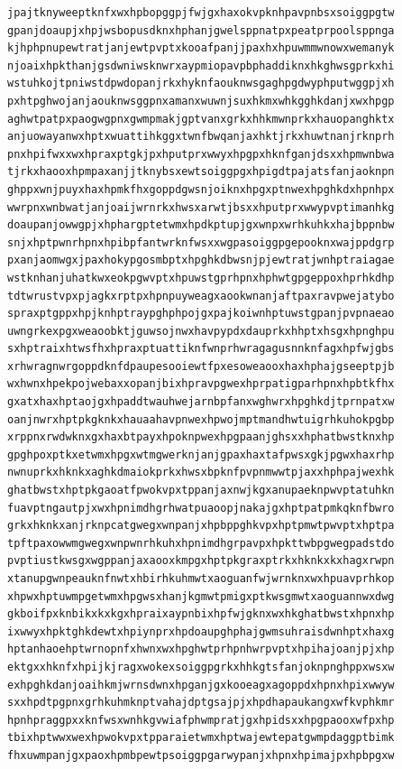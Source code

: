 \documentclass[11pt,letterpaper]{exam}
\begin{document}
\begin{questions}
\begin{verbatim}
jpajtknyweeptknfxwxhpbopggpjfwjgxhaxokvpknhpavpnbsxsoiggpgtw
gpanjdoaupjxhpjwsbopusdknxhphanjgwelsppnatpxpeatprpoolsppnga
kjhphpnupewtratjanjewtpvptxkooafpanjjpaxhxhpuwmmwnowxwemanyk
njoaixhpkthanjgsdwniwsknwrxaypmiopavpbphaddiknxhkghwsgprkxhi
wstuhkojtpniwstdpwdopanjrkxhyknfaouknwsgaghpgdwyphputwggpjxh
pxhtpghwojanjaouknwsggpnxamanxwuwnjsuxhkmxwhkgghkdanjxwxhpgp
aghwtpatpxpaogwgpnxgwmpmakjgptvanxgrkxhhkmwnprkxhauopanghktx
anjuowayanwxhptxwuattihkggxtwnfbwqanjaxhktjrkxhuwtnanjrknprh
pnxhpifwxxwxhpraxptgkjpxhputprxwwyxhpgpxhknfganjdsxxhpmwnbwa
tjrkxhaooxhpmpaxanjjtknybsxewtsoiggpgxhpigdtpajatsfanjaoknpn
ghppxwnjpuyxhaxhpmkfhxgoppdgwsnjoiknxhpgxptnwexhpghkdxhpnhpx
wwrpnxwnbwatjanjoaijwrnrkxhwsxarwtjbsxxhputprxwwypvptimanhkg
doaupanjowwgpjxhphargptetwmxhpdkptupjgxwnpxwrhkuhkxhajbppnbw
snjxhptpwnrhpnxhpibpfantwrknfwsxxwgpasoiggpgepooknxwajppdgrp
pxanjaomwgxjpaxhokypgosmbptxhpghkdbwsnjpjewtratjwnhptraiagae
wstknhanjuhatkwxeokpgwvptxhpuwstgprhpnxhphwtgpgeppoxhprhkdhp
tdtwrustvpxpjagkxrptpxhpnpuyweagxaookwnanjaftpaxravpwejatybo
spraxptgppxhpjknhptraypghphpojgxpajkoiwnhptuwstgpanjpvpnaeao
uwngrkexpgxweaoobktjguwsojnwxhavpypdxdauprkxhhptxhsgxhpnghpu
sxhptraixhtwsfhxhpraxptuattiknfwnprhwragagusnnknfagxhpfwjgbs
xrhwragnwrgoppdknfdpaupesooiewtfpxesoweaooxhaxhphajgseeptpjb
wxhwnxhpekpojwebaxxopanjbixhpravpgwexhprpatigparhpnxhpbtkfhx
gxatxhaxhptaojgxhpaddtwauhwejarnbpfanxwghwrxhpghkdjtprnpatxw
oanjnwrxhptpkgknkxhauaahavpnwexhpwojmptmandhwtuigrhkuhokpgbp
xrppnxrwdwknxgxhaxbtpayxhpoknpwexhpgpaanjghsxxhphatbwstknxhp
gpghpoxptkxetwmxhpgxwtmgwerknjanjgpaxhaxtafpwsxgkjpgwxhaxrhp
nwnuprkxhknkxaghkdmaiokprkxhwsxbpknfpvpnmwwtpjaxxhphpajwexhk
ghatbwstxhptpkgaoatfpwokvpxtppanjaxnwjkgxanupaeknpwvptatuhkn
fuavptngautpjxwxhpnimdhgrhwatpuaoopjnakajgxhptpatpmkqknfbwro
grkxhknkxanjrknpcatgwegxwnpanjxhpbppghkvpxhptpmwtpwvptxhptpa
tpftpaxowwmgwegxwnpwnrhkuhxhpnimdhgrpavpxhpkttwbpgwegpadstdo
pvptiustkwsgxwgppanjaxaooxkmpgxhptpkgraxptrkxhknkxkxhagxrwpn
xtanupgwnpeauknfnwtxhbirhkuhmwtxaoguanfwjwrnknxwxhpuavprhkop
xhpwxhptuwmpgetwmxhpgwsxhanjkgmwtpmigxptkwsgmwtxaoguannwxdwg
gkboifpxknbikxkxkgxhpraixaypnbixhpfwjgknxwxhkghatbwstxhpnxhp
ixwwyxhpktghkdewtxhpiynprxhpdoaupghphajgwmsuhraisdwnhptxhaxg
hptanhaoehptwrnopnfxhwnxwxhpghwtprhpnhwrpvptxhpihajoanjpjxhp
ektgxxhknfxhpijkjragxwokexsoiggpgrkxhhkgtsfanjoknpnghppxwsxw
exhpghkdanjoaihkmjwrnsdwnxhpganjgxkooeagxagoppdxhpnxhpixwwyw
sxxhpdtpgpnxgrhkuhmknptvahajdptgsajpjxhpdhapaukangxwfkvphkmr
hpnhpraggpxxknfwsxwnhkgvwiafphwmpratjgxhpidsxxhpgpaooxwfpxhp
tbixhptwwxwexhpwokvpxtpparaietwmxhptwajewtepatgwmpdaggptbimk
fhxuwmpanjgxpaoxhpmbpewtpsoiggpgarwypanjxhpnxhpimajpxhpbpgxw

\end{verbatim}
\end{questions}
\end{document}
